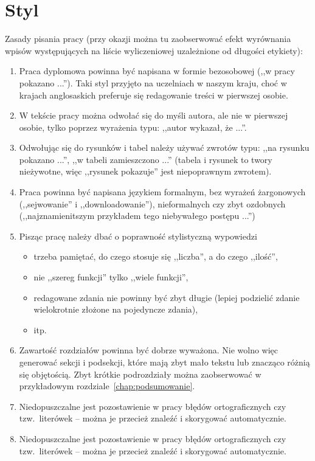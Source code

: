 \section{Styl}
\label{sec:Styl}
Zasady pisania pracy (przy okazji można tu zaobserwować efekt wyrównania wpisów występujących na liście wyliczeniowej uzależnione od długości etykiety):
\begin{enumerate}[labelwidth=\widthof{\ref{last-item}},label=\arabic*.]
\item Praca dyplomowa powinna być napisana w  formie bezosobowej (,,w pracy pokazano ...''). Taki styl przyjęto na uczelniach w naszym kraju, choć w krajach anglosaskich preferuje się redagowanie treści w pierwszej osobie.
\item W tekście pracy można odwołać się do myśli autora, ale nie w pierwszej osobie, tylko poprzez wyrażenia typu: ,,autor wykazał, że ...''. 
\item Odwołując się do rysunków i tabel należy używać zwrotów typu: ,,na rysunku pokazano ...'', ,,w tabeli zamieszczono ...'' (tabela i rysunek to twory nieżywotne, więc ,,rysunek pokazuje'' jest niepoprawnym zwrotem).
\item Praca powinna być napisana językiem formalnym, bez wyrażeń żargonowych (,,sejwowanie'' i ,,downloadowanie''), nieformalnych czy zbyt ozdobnych (,,najznamienitszym przykładem tego niebywałego postępu ...'')
\item Pisząc pracę należy dbać o poprawność stylistyczną wypowiedzi
\begin{itemize}
\item trzeba pamiętać, do czego stosuje się ,,liczba'', a do czego ,,ilość'',
\item nie ,,szereg funkcji'' tylko ,,wiele funkcji'',
\item redagowane zdania nie powinny być zbyt długie (lepiej podzielić zdanie wielokrotnie złożone na pojedyncze zdania),
\item itp.
\end{itemize}
\item Zawartość rozdziałów powinna być dobrze wyważona. Nie wolno więc generować sekcji i podsekcji, które mają zbyt mało tekstu lub znacząco różnią się objętością. Zbyt krótkie podrozdziały można zaobserwować w przykładowym rozdziale~\ref{chap:podsumowanie}.
\item Niedopuszczalne jest pozostawienie w pracy błędów ortograficznych czy tzw.\ literówek -- można je przecież znaleźć i skorygować
automatycznie. \addtocounter{enumi}{9997} 
\item  Niedopuszczalne jest pozostawienie w pracy błędów ortograficznych czy tzw.\ literówek -- można je przecież znaleźć i skorygować
automatycznie. \label{last-item}
\end{enumerate}